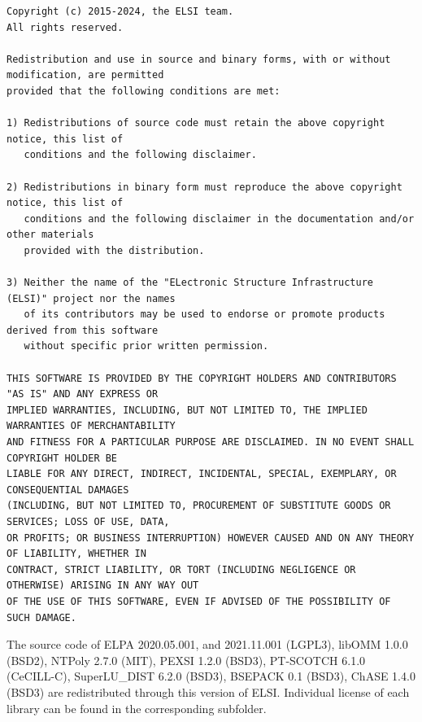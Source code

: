 \documentclass{report}
\begin{document}
\begin{tcolorbox}
\begin{Verbatim}
Copyright (c) 2015-2024, the ELSI team.
All rights reserved.

Redistribution and use in source and binary forms, with or without modification, are permitted
provided that the following conditions are met:

1) Redistributions of source code must retain the above copyright notice, this list of
   conditions and the following disclaimer.

2) Redistributions in binary form must reproduce the above copyright notice, this list of
   conditions and the following disclaimer in the documentation and/or other materials
   provided with the distribution.

3) Neither the name of the "ELectronic Structure Infrastructure (ELSI)" project nor the names
   of its contributors may be used to endorse or promote products derived from this software
   without specific prior written permission.

THIS SOFTWARE IS PROVIDED BY THE COPYRIGHT HOLDERS AND CONTRIBUTORS "AS IS" AND ANY EXPRESS OR
IMPLIED WARRANTIES, INCLUDING, BUT NOT LIMITED TO, THE IMPLIED WARRANTIES OF MERCHANTABILITY
AND FITNESS FOR A PARTICULAR PURPOSE ARE DISCLAIMED. IN NO EVENT SHALL COPYRIGHT HOLDER BE
LIABLE FOR ANY DIRECT, INDIRECT, INCIDENTAL, SPECIAL, EXEMPLARY, OR CONSEQUENTIAL DAMAGES
(INCLUDING, BUT NOT LIMITED TO, PROCUREMENT OF SUBSTITUTE GOODS OR SERVICES; LOSS OF USE, DATA,
OR PROFITS; OR BUSINESS INTERRUPTION) HOWEVER CAUSED AND ON ANY THEORY OF LIABILITY, WHETHER IN
CONTRACT, STRICT LIABILITY, OR TORT (INCLUDING NEGLIGENCE OR OTHERWISE) ARISING IN ANY WAY OUT
OF THE USE OF THIS SOFTWARE, EVEN IF ADVISED OF THE POSSIBILITY OF SUCH DAMAGE.
\end{Verbatim}
\end{tcolorbox}

The source code of ELPA 2020.05.001, and 2021.11.001 (LGPL3), libOMM 1.0.0
(BSD2), NTPoly 2.7.0 (MIT), PEXSI 1.2.0 (BSD3), PT-SCOTCH 6.1.0 (CeCILL-C),
SuperLU\_DIST 6.2.0 (BSD3), BSEPACK 0.1 (BSD3), ChASE 1.4.0 (BSD3) are
redistributed through this version of ELSI. Individual license of each
library can be found in the corresponding subfolder.
\end{document}
